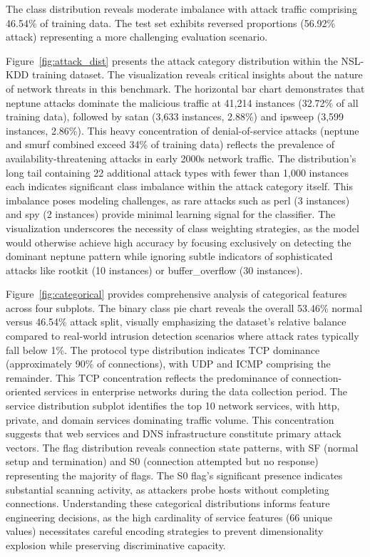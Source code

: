 \documentclass[12pt,a4paper]{report}
\begin{document}
The class distribution reveals moderate imbalance with attack traffic comprising 46.54\% of training data. The test set exhibits reversed proportions (56.92\% attack) representing a more challenging evaluation scenario.

Figure~\ref{fig:attack_dist} presents the attack category distribution within the NSL-KDD training dataset. The visualization reveals critical insights about the nature of network threats in this benchmark. The horizontal bar chart demonstrates that neptune attacks dominate the malicious traffic at 41,214 instances (32.72\% of all training data), followed by satan (3,633 instances, 2.88\%) and ipsweep (3,599 instances, 2.86\%). This heavy concentration of denial-of-service attacks (neptune and smurf combined exceed 34\% of training data) reflects the prevalence of availability-threatening attacks in early 2000s network traffic. The distribution's long tail containing 22 additional attack types with fewer than 1,000 instances each indicates significant class imbalance within the attack category itself. This imbalance poses modeling challenges, as rare attacks such as perl (3 instances) and spy (2 instances) provide minimal learning signal for the classifier. The visualization underscores the necessity of class weighting strategies, as the model would otherwise achieve high accuracy by focusing exclusively on detecting the dominant neptune pattern while ignoring subtle indicators of sophisticated attacks like rootkit (10 instances) or buffer\_overflow (30 instances).

Figure~\ref{fig:categorical} provides comprehensive analysis of categorical features across four subplots. The binary class pie chart reveals the overall 53.46\% normal versus 46.54\% attack split, visually emphasizing the dataset's relative balance compared to real-world intrusion detection scenarios where attack rates typically fall below 1\%. The protocol type distribution indicates TCP dominance (approximately 90\% of connections), with UDP and ICMP comprising the remainder. This TCP concentration reflects the predominance of connection-oriented services in enterprise networks during the data collection period. The service distribution subplot identifies the top 10 network services, with http, private, and domain services dominating traffic volume. This concentration suggests that web services and DNS infrastructure constitute primary attack vectors. The flag distribution reveals connection state patterns, with SF (normal setup and termination) and S0 (connection attempted but no response) representing the majority of flags. The S0 flag's significant presence indicates substantial scanning activity, as attackers probe hosts without completing connections. Understanding these categorical distributions informs feature engineering decisions, as the high cardinality of service features (66 unique values) necessitates careful encoding strategies to prevent dimensionality explosion while preserving discriminative capacity.
\end{document}
